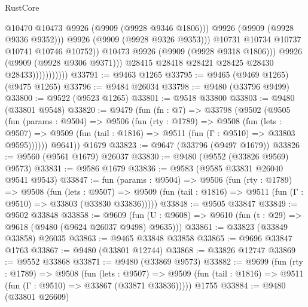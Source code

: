 \begin{lexlean}{RustCore}
\begin{coremodule}
                                        @10470
                                        @10473
                                        @9926
                                        (@9909 (@9928 @9346 @1806)))
                                      @9926
                                      (@9909 (@9928 @9336 @9352)))
                                    @9926
                                    (@9909 (@9928 @9326 @9353)))
                                  @10731
                                  @10734
                                  @10737
                                  @10741
                                  @10746
                                  @10752))
                              @10473
                              @9926
                              (@9909 (@9928 @9318 @1806)))
                            @9926
                            (@9909 (@9928 @9306 @9371)))
                          @28415
                          @28418
                          @28421
                          @28425
                          @28430
                          @28433)))))))))))
@33791 := @9463 @1265
@33795 := @9465 (@9469 @1265) (@9475 @1265)
@33796 := @9484 @26034
@33798 := @9480 (@33796 @9499)
@33800 := @9522 (@9523 @1265)
@33801 := @9518 @33800
@33803 := @9480 (@33801 @9548)
@33820 := @9479
    (fun (fn : @7) =>
    @33798
      (@9502
        (@9505
          (fun (params : @9504) =>
          @9506
            (fun (rty : @1789) =>
            @9508
              (fun (lets : @9507) =>
              @9509 (fun (tail : @1816) => @9511 (fun (Γ : @9510) => @33803 @9595))))))
        @9641))
    @1679
@33823 := @9647 (@33796 (@9497 @1679))
@33826 := @9560 (@9561 @1679) @26037
@33830 := @9480 (@9552 (@33826 @9569) @9573)
@33831 := @9586 @1679
@33836 := @9583 (@9585 @33831 @26040 @9541 @9543)
@33847 := fun (params : @9504) =>
  @9506
    (fun (rty : @1789) =>
    @9508
      (fun (lets : @9507) =>
      @9509 (fun (tail : @1816) => @9511 (fun (Γ : @9510) => @33803 (@33830 @33836)))))
@33848 := @9505 @33847
@33849 := @9502 @33848
@33858 := @9609
    (fun (U : @9608) => @9610 (fun (t : @29) => @9618 (@9480 (@9624 @26037 @9498) @9635)))
@33861 := @33823 (@33849 @33858) @26035
@33863 := @9465 @33848 @33858
@33865 := @9696 @33847 @1763
@33867 := @9480 (@33801 @12744)
@33868 := @33826 @12747
@33869 := @9552 @33868
@33871 := @9480 (@33869 @9573)
@33882 := @9699
    (fun (rty : @1789) =>
    @9508
      (fun (lets : @9507) =>
      @9509 (fun (tail : @1816) => @9511 (fun (Γ : @9510) => @33867 (@33871 @33836)))))
    @1755
@33884 := @9480 (@33801 @26609)

\end{coremodule}
\end{lexlean}
